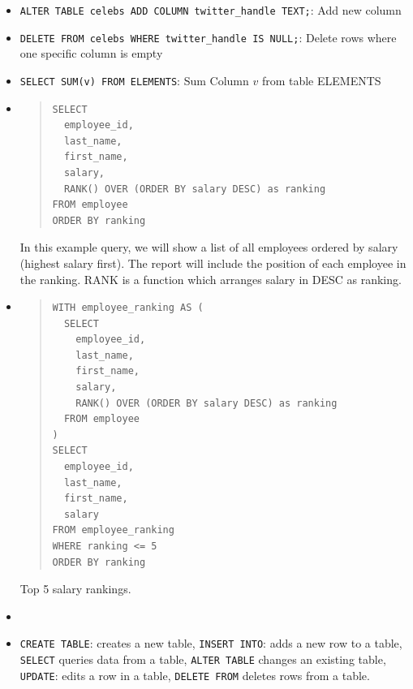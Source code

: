 \documentclass[11pt]{article}
\begin{document}
\begin{itemize}
\item \texttt{ALTER TABLE celebs  ADD COLUMN twitter\_handle TEXT;}: Add new column 
\item \texttt{DELETE FROM celebs WHERE twitter\_handle IS NULL;}: Delete rows where one specific column is empty
\item \texttt{SELECT SUM(v) FROM ELEMENTS}: Sum Column $v$ from table ELEMENTS
\item \begin{quote}
\begin{verbatim}
SELECT 
  employee_id,
  last_name,
  first_name,
  salary,
  RANK() OVER (ORDER BY salary DESC) as ranking
FROM employee
ORDER BY ranking
\end{verbatim}
\end{quote}
In this example query, we will show a list of all employees ordered by salary (highest salary first). The report will include the position of each employee in the ranking.
RANK is a function which arranges salary in DESC as ranking. 
\item \begin{quote}
\begin{verbatim}
WITH employee_ranking AS (
  SELECT
    employee_id,
    last_name,
    first_name,
    salary,
    RANK() OVER (ORDER BY salary DESC) as ranking
  FROM employee
)
SELECT
  employee_id,
  last_name,
  first_name,
  salary
FROM employee_ranking
WHERE ranking <= 5
ORDER BY ranking
\end{verbatim}
\end{quote}
Top 5 salary rankings. 
\item 




\item \texttt{CREATE TABLE}: creates a new table,  \texttt{INSERT INTO}: adds a new row to a table, \texttt{SELECT} queries data from a table, 
\texttt{ALTER TABLE} changes an existing table, \texttt{UPDATE}: edits a row in a table, \texttt{DELETE FROM} deletes rows from a table. 
\end{itemize} 

\end{document}
